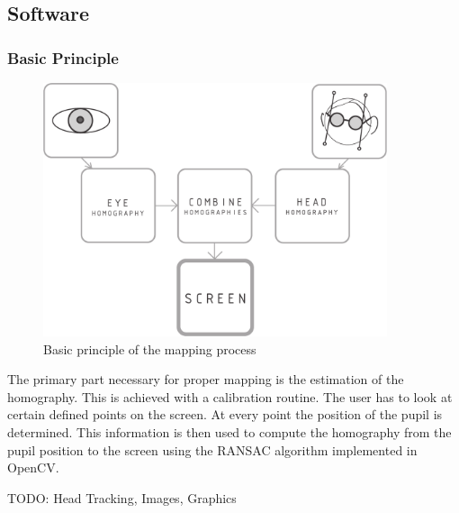 \subsection{Software}

\subsubsection{Basic Principle}
\begin{figure}[H]
  \centering
  \includegraphics[width=0.9\textwidth]{../finalpres/01c.pdf}
  \caption{Basic principle of the mapping process}\label{fig:basic}
\end{figure}
The primary part necessary for proper mapping is the estimation of the homography. 
This is achieved with a calibration routine. The user has to look at certain defined points on the screen. 
At every point the position of the pupil is determined. 
This information is then used to compute the homography from the pupil position to the screen using the RANSAC algorithm implemented in OpenCV. 

TODO: Head Tracking, Images, Graphics

